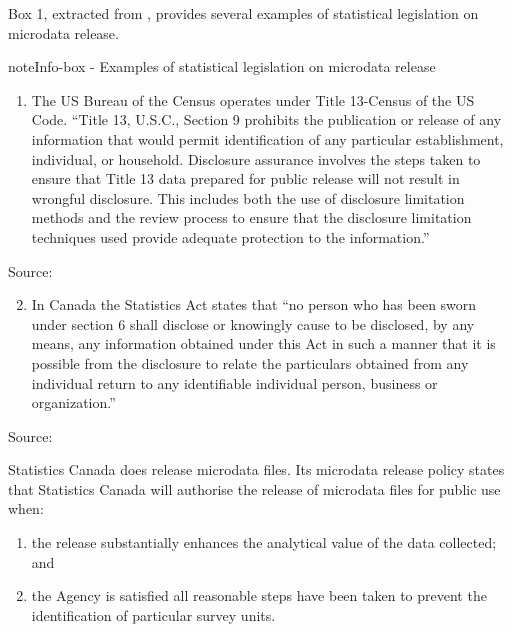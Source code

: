 \documentclass[letterpaper,10pt,english]{sphinxmanual}
\begin{document}
Box 1, extracted from {\hyperref[\detokenize{SDC_intro:dubo10}]{}}, provides several
examples of statistical legislation on microdata release.

\begin{sphinxadmonition}{note}{Info-box - Examples of statistical legislation on microdata release}
\begin{enumerate}
\item {} 
The US Bureau of the Census operates under Title 13-Census of the US Code. “Title 13, U.S.C., Section 9 prohibits the publication or release of any information that would permit identification of any particular establishment, individual, or household. Disclosure assurance involves the steps taken to ensure that Title 13 data prepared for public release will not result in wrongful disclosure. This includes both the use of disclosure limitation methods and the review process to ensure that the disclosure limitation techniques used provide adequate protection to the information.”

\end{enumerate}

Source: 
\begin{enumerate}
\setcounter{enumi}{1}
\item {} 
In Canada the Statistics Act states that “no person who has been sworn under section 6 shall disclose or knowingly cause to be disclosed, by any means, any information obtained under this Act in such a manner that it is possible from the disclosure to relate the particulars obtained from any individual return to any identifiable individual person, business or organization.”

\end{enumerate}

Source: 

Statistics Canada does release microdata files. Its microdata release policy states that Statistics Canada will authorise the release of microdata files for public use when:
\begin{enumerate}
\item {} 
the release substantially enhances the analytical value of the data collected; and

\item {} 
the Agency is satisfied all reasonable steps have been taken to prevent the identification of particular survey units.


\end{enumerate}
\end{sphinxadmonition}
\end{document}
